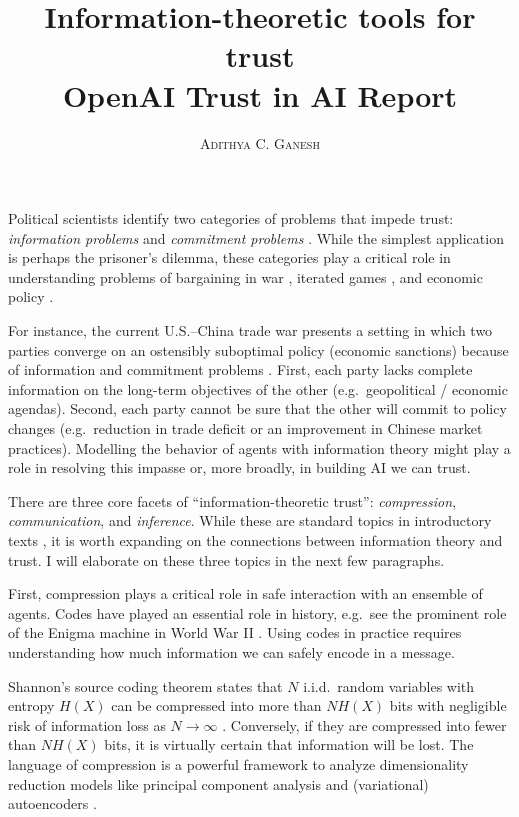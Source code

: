 \documentclass[11pt]{article}
\title{Information-theoretic tools for trust \\ \vspace{0.3cm} OpenAI Trust in AI Report}
\author{\textsc{Adithya C. Ganesh}}
\begin{document}
Political scientists identify two categories of problems that impede trust: {\it information problems} and {\it commitment problems} \cite{frieden2010world}.  While the simplest application is perhaps the prisoner's dilemma, these categories play a critical role in understanding problems of bargaining in war \cite{lake2010two}, iterated games \cite{axelrod1981evolution}, and economic policy \cite{panagariya2003international}.

For instance, the current U.S.--China trade war presents a setting in which two parties converge on an ostensibly suboptimal policy (economic sanctions) because of information and commitment problems \cite{liu2018understanding}\cite{amiti2019impact}\cite{li2018economic}.  First, each party lacks complete information on the long-term objectives of the other (e.g.\ geopolitical / economic agendas).  Second, each party cannot be sure that the other will commit to policy changes (e.g.\ reduction in trade deficit or an improvement in Chinese market practices).  Modelling the behavior of agents with information theory might play a role in resolving this impasse or, more broadly, in building AI we can trust. 

There are three core facets of ``information-theoretic trust'': {\it compression}, {\it communication}, and {\it inference}.  While these are standard topics in introductory texts \cite{cover2012elements}\cite{mackay2003information}, it is worth expanding on the connections between information theory and trust.  I will elaborate on these three topics in the next few paragraphs.

First, compression plays a critical role in safe interaction with an ensemble of agents.  Codes have played an essential role in history, e.g.\ see the prominent role of the Enigma machine in World War II \cite{booss2003mathematics}.  Using codes in practice requires understanding how much information we can safely encode in a message.

Shannon's source coding theorem states that $N$ i.i.d.\ random variables with entropy $H(X)$ can be compressed into more than $N H(X)$ bits with negligible risk of information loss as $N \to \infty$ \cite{shannon1948mathematical}\cite{mackay2003information}.  Conversely, if they are compressed into fewer than $N H(X)$ bits, it is virtually certain that information will be lost.  The language of compression is a powerful framework to analyze dimensionality reduction models like principal component analysis \cite{geiger2012relative} and (variational) autoencoders \cite{doersch2016tutorial}.
\end{document}
